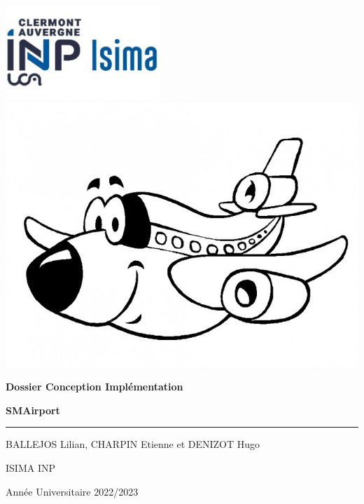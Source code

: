 \documentclass[12pt,french]{article} %
\begin{document}
\begin{titlepage} %

  
  \includegraphics[scale=0.6]{isima.png}
  \includegraphics[scale=0.2]{deco.jpg}
  
  \vspace*{2.5cm} %
  
  \begin{center}\huge
    \textbf{Dossier Conception Implémentation} 
    
    \textbf{SMAirport}
  \end{center}
  
  \hrule %
  
  \begin{center}
    \Large BALLEJOS Lilian,
    \Large CHARPIN Etienne et
    \Large DENIZOT Hugo
    
    \large
    
    ISIMA INP
  
    Année Universitaire 2022/2023
  \end{center}
  
  \begin{center}
  \end{center}
  

\end{titlepage}
\end{document}
